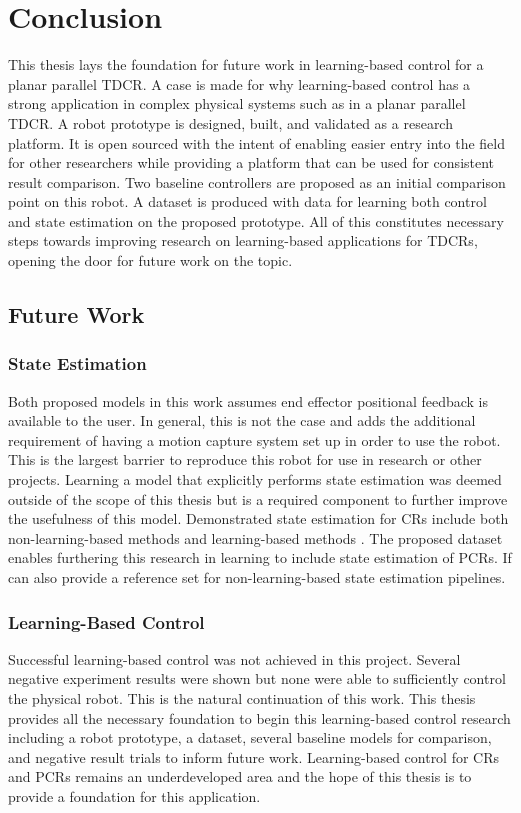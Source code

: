 \pagebreak
\section{Conclusion}
\label{sec:conclusion}

This thesis lays the foundation for future work in learning-based control for a planar parallel TDCR. A case is made for why learning-based control has a strong application in complex physical systems such as in a planar parallel TDCR. A robot prototype is designed, built, and validated as a research platform. It is open sourced with the intent of enabling easier entry into the field for other researchers while providing a platform that can be used for consistent result comparison. Two baseline controllers are proposed as an initial comparison point on this robot. A dataset is produced with data for learning both control and state estimation on the proposed prototype. All of this constitutes necessary steps towards improving research on learning-based applications for TDCRs, opening the door for future work on the topic.

\subsection{Future Work}
\subsubsection{State Estimation}
Both proposed models in this work assumes end effector positional feedback is available to the user. In general, this is not the case and adds the additional requirement of having a motion capture system set up in order to use the robot. This is the largest barrier to reproduce this robot for use in research or other projects. Learning a model that explicitly performs state estimation was deemed outside of the scope of this thesis but is a required component to further improve the usefulness of this model. Demonstrated state estimation for CRs include both non-learning-based methods and learning-based methods \cite{10.3389/frobt.2021.730330}. The proposed dataset enables furthering this research in learning to include state estimation of PCRs. If can also provide a reference set for non-learning-based state estimation pipelines. 

\subsubsection{Learning-Based Control}
Successful learning-based control was not achieved in this project. Several negative experiment results were shown but none were able to sufficiently control the physical robot. This is the natural continuation of this work. This thesis provides all the necessary foundation to begin this learning-based control research including a robot prototype, a dataset, several baseline models for comparison, and negative result trials to inform future work. Learning-based control for CRs and PCRs remains an underdeveloped area and the hope of this thesis is to provide a foundation for this application. 